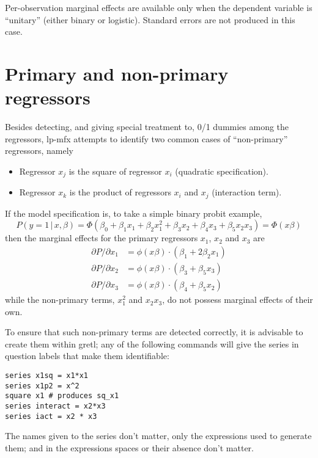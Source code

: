 \documentclass{article}
\begin{document}
Per-observation marginal effects are available only when the dependent
variable is ``unitary'' (either binary or logistic). Standard errors
are not produced in this case.

\section{Primary and non-primary regressors}

Besides detecting, and giving special treatment to, 0/1 dummies among
the regressors, \textsf{lp-mfx} attempts to identify two common cases
of ``non-primary'' regressors, namely
\begin{itemize}
\item Regressor $x_j$ is the square of regressor $x_i$ (quadratic
  specification).
\item Regressor $x_k$ is the product of regressors $x_i$ and $x_j$
  (interaction term).
\end{itemize}
If the model specification is, to take a simple binary probit example,
\[
  P(y=1\, |\, x, \beta) = \Phi(\beta_0 + \beta_1 x_1 + \beta_2 x_1^2 +
  \beta_3 x_2 + \beta_4 x_3 + \beta_5 x_2 x_3) = \Phi(x\beta)
\]
then the marginal effects for the primary regressors $x_1$, $x_2$ and
$x_3$ are
\begin{align*}
  \partial  P/\partial x_1 &=\phi(x\beta)\cdot (\beta_1 + 2 \beta_2x_1) \\
  \partial  P/\partial x_2 &=\phi(x\beta)\cdot (\beta_3 + \beta_5x_3) \\
  \partial  P/\partial x_3 &=\phi(x\beta)\cdot (\beta_4 + \beta_5x_2)
\end{align*}
while the non-primary terms, $x_1^2$ and $x_2 x_3$, do not possess
marginal effects of their own.

To ensure that such non-primary terms are detected correctly, it is
advisable to create them within gretl; any of the following
commands will give the series in question labels that make them
identifiable:
\begin{verbatim}
series x1sq = x1*x1
series x1p2 = x^2
square x1 # produces sq_x1
series interact = x2*x3
series iact = x2 * x3
\end{verbatim}
The names given to the series don't matter, only the expressions used
to generate them; and in the expressions spaces or their absence don't
matter.
\end{document}
